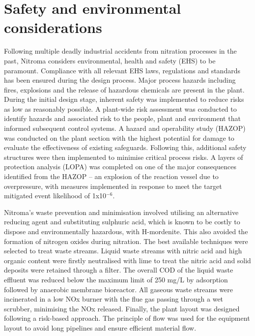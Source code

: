 \section*{Safety and environmental considerations}

Following multiple deadly industrial accidents from nitration processes in the past, Nitroma considers environmental, health and safety (EHS) to be paramount. Compliance with all relevant EHS laws, regulations and standards has been ensured during the design process.  Major process hazards including fires, explosions and the release of hazardous chemicals are present in the plant. During the initial design stage, inherent safety was implemented to reduce risks as low as reasonably possible. A plant-wide risk assessment was conducted to identify hazards and associated risk to the people, plant and environment that informed subsequent control systems. A hazard and operability study (HAZOP) was conducted on the plant section with the highest potential for damage to evaluate the effectiveness of existing safeguards. Following this, additional safety structures were then implemented to minimise critical process risks. A layers of protection analysis (LOPA) was completed on one of the major consequences identified from the HAZOP – an explosion of the reaction vessel due to overpressure, with measures implemented in response to meet the target mitigated event likelihood of 1x10$^{-6}$.  

Nitroma's waste prevention and minimisation involved utilising an alternative reducing agent and substituting sulphuric acid, which is known to be costly to dispose and environmentally hazardous, with H-mordenite. This also avoided the formation of nitrogen oxides during nitration. The best available techniques  were selected to treat waste streams. Liquid waste streams with nitric acid and high organic content were firstly neutralised with lime to treat the nitric acid and solid deposits were retained through a filter. The overall COD of the liquid waste effluent was reduced below the maximum limit of 250 mg/L by adsorption followed by anaerobic membrane bioreactor. All gaseous waste streams were incinerated in a low NOx burner with the flue gas passing through a wet scrubber, minimising the NOx released. Finally, the plant layout was designed following a risk-based approach. The principle of flow was used for the equipment layout to avoid long pipelines and ensure efficient material flow. 
